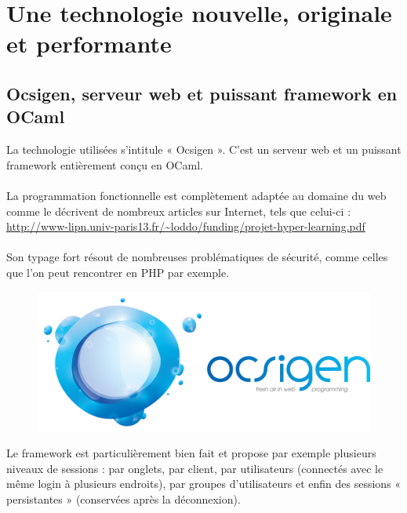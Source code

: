 \documentclass{life-fr}
\begin{document}

\chapter{Une technologie nouvelle, originale et performante}

\section{Ocsigen, serveur web et puissant framework en OCaml}

La technologie utilisées s'intitule « Ocsigen ». C'est un serveur web et un puissant framework entièrement conçu en OCaml.\\
  \\
La programmation fonctionnelle est complètement adaptée au domaine du web comme le décrivent de nombreux articles sur Internet, tels que celui-ci :\\
\url{http://www-lipn.univ-paris13.fr/~loddo/funding/projet-hyper-learning.pdf}\\
\\
Son typage fort résout de nombreuses problématiques de sécurité, comme celles que l'on peut rencontrer en PHP par exemple.\\

\begin{figure}[H]
  \begin{center}
    \includegraphics[width=13cm]{img/ocsigen.png}
  \end{center}
\end{figure}

Le framework est particulièrement bien fait et propose par exemple plusieurs niveaux de sessions : par onglets, par client, par utilisateurs (connectés avec le même login à plusieurs endroits), par groupes d'utilisateurs et enfin des sessions « persistantes » (conservées après la déconnexion).\\
\end{document}
